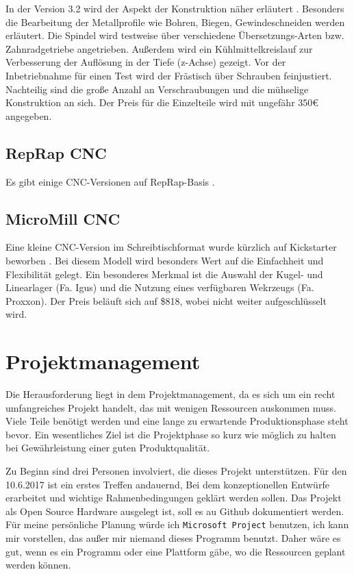 \documentclass[
	a4paper,
	smallheadings,
	german,
	]
	{scrreprt}
\begin{document}
In der Version 3.2 wird der Aspekt der Konstruktion näher erläutert \autocite{:Heinz_CNC_3.2}.
Besonders die Bearbeitung der Metallprofile wie Bohren, Biegen, Gewindeschneiden werden erläutert.
Die Spindel wird testweise über verschiedene Übersetzungs-Arten bzw. Zahnradgetriebe angetrieben.
Außerdem wird ein Kühlmittelkreislauf zur Verbesserung der Auflösung in der Tiefe (z-Achse) gezeigt. 
Vor der Inbetriebnahme für einen Test wird der Frästisch über Schrauben feinjustiert.
Nachteilig sind die große Anzahl an Verschraubungen und die mühselige Konstruktion an sich.
Der Preis für die Einzelteile wird mit ungefähr 350€ angegeben. 

\section{RepRap CNC}
Es gibt einige CNC-Versionen auf RepRap-Basis \autocite{:02}.

\section{MicroMill CNC}
Eine kleine CNC-Version im Schreibtischformat wurde kürzlich auf Kickstarter beworben \autocite{:kickstarter}.
Bei diesem Modell wird besonders Wert auf die Einfachheit und Flexibilität gelegt.
Ein besonderes Merkmal ist die Auswahl der Kugel- und Linearlager (Fa. Igus) und die Nutzung eines verfügbaren Wekrzeugs (Fa. Proxxon). 
Der Preis beläuft sich auf \$818, wobei nicht weiter aufgeschlüsselt wird. 

\chapter{Projektmanagement}

Die Herausforderung liegt in dem Projektmanagement, da es sich um ein recht umfangreiches Projekt handelt, das mit wenigen Ressourcen auskommen muss.
Viele Teile benötigt werden und eine lange zu erwartende Produktionsphase steht bevor.
Ein wesentliches Ziel ist die Projektphase so kurz wie möglich zu halten bei Gewährleistung einer guten Produktqualität.

Zu Beginn sind drei Personen involviert, die dieses Projekt unterstützen.
Für den 10.6.2017 ist ein erstes Treffen andauernd, Bei dem konzeptionellen Entwürfe erarbeitet und wichtige Rahmenbedingungen geklärt werden sollen.
Das Projekt als Open Source Hardware ausgelegt ist, soll es au Github dokumentiert werden.
Für meine persönliche Planung würde ich \texttt{Microsoft Project} benutzen, ich kann mir vorstellen, das außer mir niemand dieses Programm benutzt.
Daher wäre es gut, wenn es ein Programm oder eine Plattform gäbe, wo die Ressourcen geplant werden können.
\end{document}
